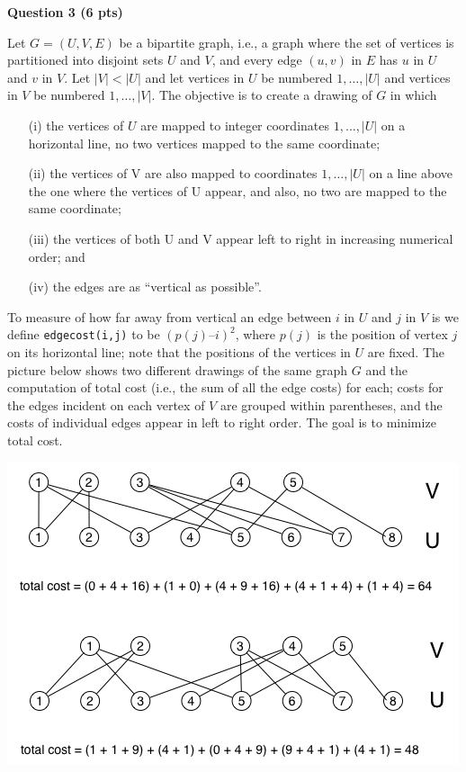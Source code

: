 \documentclass{article}
\begin{document}
\begin{framed}
    \textbf{Question 3 (6 pts)}

    Let $G = (U, V, E)$ be a bipartite graph, i.e., a graph where the set of 
    vertices is partitioned into disjoint sets $U$ and $V$, and every edge 
    $(u,v)$ in $E$ has $u$ in $U$ and $v$ in $V$. Let $|V| < |U|$ and let 
    vertices in $U$ be numbered $1, \ldots , |U|$ and vertices in $V$ be 
    numbered $1, \dots , |V|$. The objective is to create a drawing of $G$ in 
    which
    \begin{enumerate}
        \item[(i)] the vertices of $U$ are mapped to integer coordinates $1, 
            \ldots , |U|$ on a horizontal line, no two vertices mapped to the 
            same coordinate; 
        \item[(ii)] the vertices of V are also mapped to coordinates $1, \ldots
            , |U|$ on a line above the one where the vertices of U appear, and 
            also, no two are mapped to the same coordinate;
        \item[(iii)] the vertices of both U and V appear left to right in 
            increasing numerical order; and 
        \item[(iv)] the edges are as “vertical as possible”. 
    \end{enumerate}
    
    To measure of how far away from vertical an edge between $i$ in $U$ and $j$
    in $V$ is we define \texttt{edgecost(i,j)} to be $(p(j) – i)^{2}$, where 
    $p(j)$ is the position of vertex $j$ on its horizontal line; note that the 
    positions of the vertices in $U$ are fixed. The picture below shows two 
    different drawings of the same graph $G$ and the computation of total cost 
    (i.e., the sum of all the edge costs) for each; costs for the edges 
    incident on each vertex of $V$ are grouped within parentheses, and the costs
    of individual edges appear in left to right order. The goal is to minimize 
    total cost.

    \includegraphics[width=\textwidth]{graph}


\end{framed}
\end{document}
